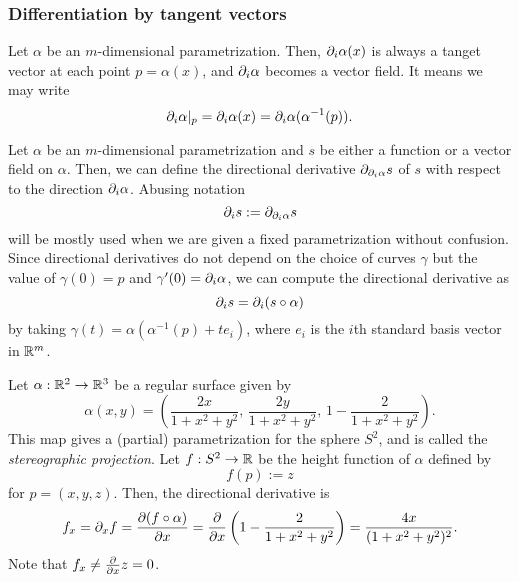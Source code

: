 \documentclass{../exp}
\def\a{\alpha}
\begin{document}

\subsubsection{Differentiation by tangent vectors}



\begin{ex}
Let $\a$ be an $m$-dimensional parametrization.
Then, $\pd_i\a(x)$ is always a tanget vector at each point $p=\a(x)$, and $\pd_i\a$ becomes a vector field.
It means we may write
\[\pd_i\a|_p=\pd_i\a(x)=\pd_i\a(\a^{-1}(p)).\]
\end{ex}



\begin{ex}
Let $\a$ be an $m$-dimensional parametrization and $s$ be either a function or a vector field on $\a$.
Then, we can define the directional derivative $\pd_{\pd_i\a}s$ of $s$ with respect to the direction $\pd_i\a$.
Abusing notation
\[\pd_is:=\pd_{\pd_i\a}s\]
will be mostly used when we are given a fixed parametrization without confusion.
Since directional derivatives do not depend on the choice of curves $\gamma$ but the value of $\gamma(0)=p$ and $\gamma'(0)=\pd_i\a$, we can compute the directional derivative as
\[\pd_is=\pd_i(s\o\a)\] by taking $\gamma(t)=\a(\a^{-1}(p)+te_i)$, where $e_i$ is the $i$th standard basis vector in $\mathbb{R}^m$.
\end{ex}

\begin{ex}
Let $\a:\R^2\to\R^3$ be a regular surface given by
\[\a(x,y)=\left(\frac{2x}{1+x^2+y^2},\,\frac{2y}{1+x^2+y^2},\,1-\frac2{1+x^2+y^2}\right).\]
This map gives a (partial) parametrization for the sphere $S^2$, and is called the \emph{stereographic projection}.
Let $f:S^2\to\R$ be the height function of $\a$ defined by
\[f(p):=z\]
for $p=(x,y,z)$.
Then, the directional derivative is
\[f_x=\pd_xf=\pd{(f\o\a)}{x}=\pd{x}\left(1-\frac2{1+x^2+y^2}\right)=\frac{4x}{(1+x^2+y^2)^2}.\]
Note that $f_x\ne\pd{x}z=0$.
\end{ex}



\end{document}
